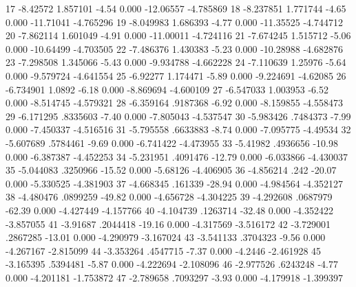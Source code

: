         17  {\VBAR}   -8.42572   1.857101    -4.54   0.000    -12.06557   -4.785869
         18  {\VBAR}  -8.237851   1.771744    -4.65   0.000    -11.71041   -4.765296
         19  {\VBAR}  -8.049983   1.686393    -4.77   0.000    -11.35525   -4.744712
         20  {\VBAR}  -7.862114   1.601049    -4.91   0.000    -11.00011   -4.724116
         21  {\VBAR}  -7.674245   1.515712    -5.06   0.000    -10.64499   -4.703505
         22  {\VBAR}  -7.486376   1.430383    -5.23   0.000    -10.28988   -4.682876
         23  {\VBAR}  -7.298508   1.345066    -5.43   0.000    -9.934788   -4.662228
         24  {\VBAR}  -7.110639    1.25976    -5.64   0.000    -9.579724   -4.641554
         25  {\VBAR}   -6.92277   1.174471    -5.89   0.000    -9.224691    -4.62085
         26  {\VBAR}  -6.734901     1.0892    -6.18   0.000    -8.869694   -4.600109
         27  {\VBAR}  -6.547033   1.003953    -6.52   0.000    -8.514745   -4.579321
         28  {\VBAR}  -6.359164   .9187368    -6.92   0.000    -8.159855   -4.558473
         29  {\VBAR}  -6.171295   .8335603    -7.40   0.000    -7.805043   -4.537547
         30  {\VBAR}  -5.983426   .7484373    -7.99   0.000    -7.450337   -4.516516
         31  {\VBAR}  -5.795558   .6633883    -8.74   0.000    -7.095775    -4.49534
         32  {\VBAR}  -5.607689   .5784461    -9.69   0.000    -6.741422   -4.473955
         33  {\VBAR}   -5.41982   .4936656   -10.98   0.000    -6.387387   -4.452253
         34  {\VBAR}  -5.231951   .4091476   -12.79   0.000    -6.033866   -4.430037
         35  {\VBAR}  -5.044083   .3250966   -15.52   0.000     -5.68126   -4.406905
         36  {\VBAR}  -4.856214       .242   -20.07   0.000    -5.330525   -4.381903
         37  {\VBAR}  -4.668345    .161339   -28.94   0.000    -4.984564   -4.352127
         38  {\VBAR}  -4.480476   .0899259   -49.82   0.000    -4.656728   -4.304225
         39  {\VBAR}  -4.292608   .0687979   -62.39   0.000    -4.427449   -4.157766
         40  {\VBAR}  -4.104739   .1263714   -32.48   0.000    -4.352422   -3.857055
         41  {\VBAR}   -3.91687   .2044418   -19.16   0.000    -4.317569   -3.516172
         42  {\VBAR}  -3.729001   .2867285   -13.01   0.000    -4.290979   -3.167024
         43  {\VBAR}  -3.541133   .3704323    -9.56   0.000    -4.267167   -2.815099
         44  {\VBAR}  -3.353264   .4547715    -7.37   0.000      -4.2446   -2.461928
         45  {\VBAR}  -3.165395   .5394481    -5.87   0.000    -4.222694   -2.108096
         46  {\VBAR}  -2.977526   .6243248    -4.77   0.000    -4.201181   -1.753872
         47  {\VBAR}  -2.789658   .7093297    -3.93   0.000    -4.179918   -1.399397
